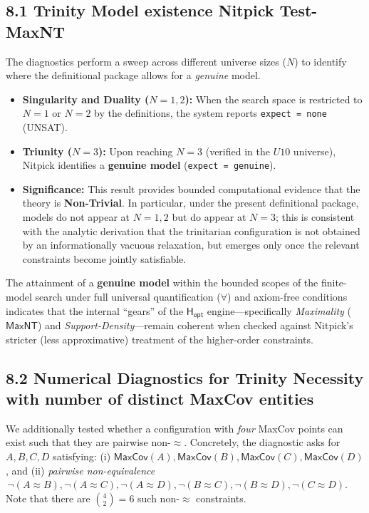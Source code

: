 \documentclass[a4paper, 11pt]{article}
\theoremstyle{plain}
\theoremstyle{definition}
\newcommand{\Hopt}{\mathsf{H_{opt}}}       %
\begin{document}
\subsection{8.1 Trinity Model existence Nitpick Test- MaxNT}
The diagnostics perform a sweep across different universe sizes ($N$) to identify where the definitional package allows for a \textit{genuine} model.

\begin{itemize}
    \item \textbf{Singularity and Duality ($N=1, 2$):} When the search space is restricted to $N=1$ or $N=2$ by the definitions, the system reports \texttt{expect = none} (UNSAT).
    \item \textbf{Triunity ($N=3$):} Upon reaching $N=3$ (verified in the $U10$ universe), Nitpick identifies a \textbf{genuine model} (\texttt{expect = genuine}).
    \item \textbf{Significance:} This result provides bounded computational evidence that the theory is \textbf{Non-Trivial}. In particular, under the present definitional package, models do not appear at $N=1,2$ but do appear at $N=3$; this is consistent with the analytic derivation that the trinitarian configuration is not obtained by an informationally vacuous relaxation, but emerges only once the relevant constraints become jointly satisfiable.
\end{itemize}

The attainment of a \textbf{genuine model} within the bounded scopes of the finite-model search under full universal quantification ($\forall$) and axiom-free conditions indicates that the internal ``gears'' of the $\Hopt$ engine—specifically \textit{Maximality} ($\mathsf{MaxNT}$) and \textit{Support-Density}—remain coherent when checked against Nitpick's stricter (less approximative) treatment of the higher-order constraints.

\subsection{8.2 Numerical Diagnostics for Trinity Necessity with number of distinct MaxCov entities}
We additionally tested whether a configuration with \emph{four} MaxCov points can exist such that they are
pairwise non-$\approx$. Concretely, the diagnostic asks for $A,B,C,D$ satisfying:
(i) $\mathsf{MaxCov}(A),\mathsf{MaxCov}(B),\mathsf{MaxCov}(C),\mathsf{MaxCov}(D)$, and
(ii) \emph{pairwise non-equivalence} $\,\neg(A\approx B),\neg(A\approx C),\neg(A\approx D),\neg(B\approx C),\neg(B\approx D),\neg(C\approx D)$.
Note that there are $\binom{4}{2}=6$ such non-$\approx$ constraints.
\end{document}

